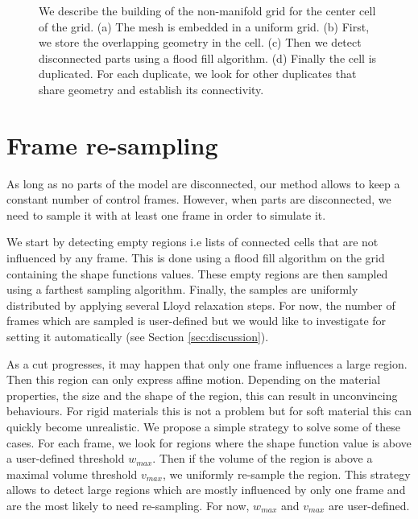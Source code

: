 \begin{figure}[!ht]
\begin{subfigure}[b]{0.20\linewidth}
\caption{\label{fig:buildNMG4}}
\end{subfigure}
\caption[Frame-based cutting: Non-manifold grid building]{\label{fig:nonmanifoldgridbuilding}
We describe the building of the non-manifold grid for the center cell of the grid. (a) The mesh is embedded in a uniform grid. (b) First, we store the overlapping geometry in the cell. (c) Then we detect disconnected parts using a flood fill algorithm. (d) Finally the cell is duplicated. For each duplicate, we look for other duplicates that share geometry and establish its connectivity.}
\end{figure}


\section{Frame re-sampling} \label{sec:resampling}
As long as no parts of the model are disconnected, our method allows to keep a constant number of control frames. However, when parts are disconnected, we need to sample it with at least one frame in order to simulate it. 

We start by detecting empty regions i.e lists of connected cells that are not influenced by any frame. This is done using a flood fill algorithm on the grid containing the shape functions values. These empty regions are then sampled using a farthest sampling algorithm. Finally, the samples are uniformly distributed by applying several Lloyd relaxation steps. For now, the number of frames which are sampled is user-defined but we would like to investigate for setting it automatically (see Section \ref{sec:discussion}). 

As a cut progresses, it may happen that only one frame influences a large region. Then this region can only express affine motion. Depending on the material properties, the size and the shape of the region, this can result in unconvincing behaviours. For rigid materials this is not a problem but for soft material this can quickly become unrealistic. We propose a simple strategy to solve some of these cases. For each frame, we look for regions where the shape function value is above a user-defined threshold $w_{max}$. Then if the volume of the region is above a maximal volume threshold $v_{max}$, we uniformly re-sample the region. This strategy allows to detect large regions which are mostly influenced by only one frame and are the most likely to need re-sampling. For now, $w_{max}$ and $v_{max}$ are user-defined.


